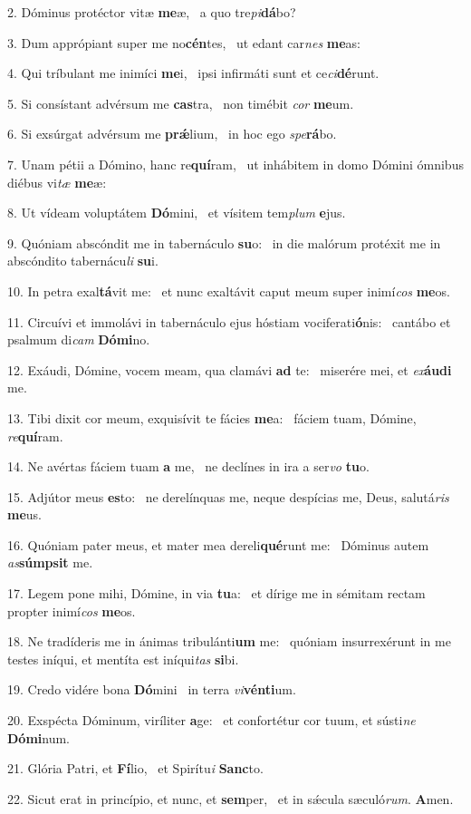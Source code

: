 2. Dóminus protéctor vitæ \textbf{me}æ, \ast\  a quo tre\textit{pi}\textbf{dá}bo?\

3. Dum apprópiant super me no\textbf{cén}tes, \ast\  ut edant car\textit{nes} \textbf{me}as:\

4. Qui tríbulant me inimíci \textbf{me}i, \ast\  ipsi infirmáti sunt et ce\textit{ci}\textbf{dé}runt.\

5. Si consístant advérsum me \textbf{cas}tra, \ast\  non timébit \textit{cor} \textbf{me}um.\

6. Si exsúrgat advérsum me \textbf{prǽ}lium, \ast\  in hoc ego \textit{spe}\textbf{rá}bo.\

7. Unam pétii a Dómino, hanc re\textbf{quí}ram, \ast\  ut inhábitem in domo Dómini ómnibus diébus vi\textit{tæ} \textbf{me}æ:\

8. Ut vídeam voluptátem \textbf{Dó}mini, \ast\  et vísitem tem\textit{plum} \textbf{e}jus.\

9. Quóniam abscóndit me in tabernáculo \textbf{su}o: \ast\  in die malórum protéxit me in abscóndito tabernácu\textit{li} \textbf{su}i.\

10. In petra exal\textbf{tá}vit me: \ast\  et nunc exaltávit caput meum super inimí\textit{cos} \textbf{me}os.\

11. Circuívi et immolávi in tabernáculo ejus hóstiam vociferati\textbf{ó}nis: \ast\  cantábo et psalmum di\textit{cam} \textbf{Dó}\textbf{mi}no.\

12. Exáudi, Dómine, vocem meam, qua clamávi \textbf{ad} te: \ast\  miserére mei, et \textit{ex}\textbf{áu}\textbf{di} me.\

13. Tibi dixit cor meum, exquisívit te fácies \textbf{me}a: \ast\  fáciem tuam, Dómine, \textit{re}\textbf{quí}ram.\

14. Ne avértas fáciem tuam \textbf{a} me, \ast\  ne declínes in ira a ser\textit{vo} \textbf{tu}o.\

15. Adjútor meus \textbf{es}to: \ast\  ne derelínquas me, neque despícias me, Deus, salutá\textit{ris} \textbf{me}us.\

16. Quóniam pater meus, et mater mea dereli\textbf{qué}runt me: \ast\  Dóminus autem \textit{as}\textbf{súmp}\textbf{sit} me.\

17. Legem pone mihi, Dómine, in via \textbf{tu}a: \ast\  et dírige me in sémitam rectam propter inimí\textit{cos} \textbf{me}os.\

18. Ne tradíderis me in ánimas tribulánti\textbf{um} me: \ast\  quóniam insurrexérunt in me testes iníqui, et mentíta est iníqui\textit{tas} \textbf{si}bi.\

19. Credo vidére bona \textbf{Dó}mini \ast\  in terra \textit{vi}\textbf{vén}\textbf{ti}um.\

20. Exspécta Dóminum, viríliter \textbf{a}ge: \ast\  et confortétur cor tuum, et sústi\textit{ne} \textbf{Dó}\textbf{mi}num.\

21. Glória Patri, et \textbf{Fí}lio, \ast\  et Spirítu\textit{i} \textbf{Sanc}to.\

22. Sicut erat in princípio, et nunc, et \textbf{sem}per, \ast\  et in sǽcula sæculó\textit{rum}. \textbf{A}men.\

